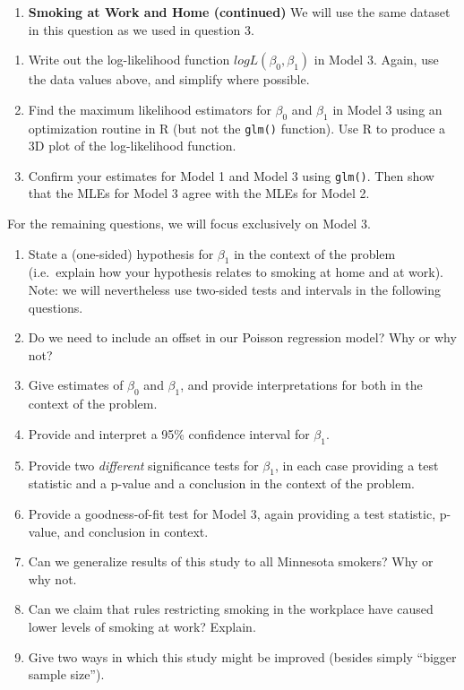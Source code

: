 \documentclass[
]{krantz}
\providecommand{\tightlist}{%
  \setlength{\itemsep}{0pt}\setlength{\parskip}{0pt}}
\begin{document}
\begin{enumerate}
\def\labelenumi{\arabic{enumi}.}
\setcounter{enumi}{3}
\tightlist
\item
  \textbf{Smoking at Work and Home (continued)} We will use the same dataset in this question as we used in question 3.
\end{enumerate}

\begin{enumerate}
\def\labelenumi{\alph{enumi}.}
\tightlist
\item
  Write out the log-likelihood function \(logL(\beta_0, \beta_1)\) in Model 3. Again, use the data values above, and simplify where possible.
\item
  Find the maximum likelihood estimators for \(\beta_0\) and \(\beta_1\) in Model 3 using an optimization routine in R (but not the \texttt{glm()} function). Use R to produce a 3D plot of the log-likelihood function.
\item
  Confirm your estimates for Model 1 and Model 3 using \texttt{glm()}. Then show that the MLEs for Model 3 agree with the MLEs for Model 2.
\end{enumerate}

For the remaining questions, we will focus exclusively on Model 3.

\begin{enumerate}
\def\labelenumi{\alph{enumi}.}
\setcounter{enumi}{3}
\tightlist
\item
  State a (one-sided) hypothesis for \(\beta_1\) in the context of the problem (i.e.~explain how your hypothesis relates to smoking at home and at work). Note: we will nevertheless use two-sided tests and intervals in the following questions.
\item
  Do we need to include an offset in our Poisson regression model? Why or why not?
\item
  Give estimates of \(\beta_0\) and \(\beta_1\), and provide interpretations for both in the context of the problem.
\item
  Provide and interpret a 95\% confidence interval for \(\beta_1\).
\item
  Provide two \emph{different} significance tests for \(\beta_1\), in each case providing a test statistic and a p-value and a conclusion in the context of the problem.
\item
  Provide a goodness-of-fit test for Model 3, again providing a test statistic, p-value, and conclusion in context.
\item
  Can we generalize results of this study to all Minnesota smokers? Why or why not.
\item
  Can we claim that rules restricting smoking in the workplace have caused lower levels of smoking at work? Explain.
\item
  Give two ways in which this study might be improved (besides simply ``bigger sample size'').
\end{enumerate}
\end{document}
